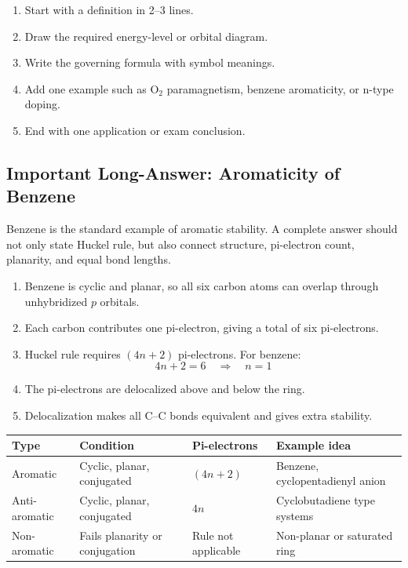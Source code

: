 \documentclass[12pt,a4paper]{article}
\begin{document}
\begin{tcolorbox}[masonbox, title={How to Write 10-Mark Answers in This Module}]
\begin{enumerate}[leftmargin=*, itemsep=3pt, topsep=2pt]
  \item Start with a definition in 2--3 lines.
  \item Draw the required energy-level or orbital diagram.
  \item Write the governing formula with symbol meanings.
  \item Add one example such as $\mathrm{O_2}$ paramagnetism, benzene aromaticity, or n-type doping.
  \item End with one application or exam conclusion.
\end{enumerate}
\end{tcolorbox}

\subsection{Important Long-Answer: Aromaticity of Benzene}
Benzene is the standard example of aromatic stability. A complete answer should not only state Huckel rule, but also connect structure, pi-electron count, planarity, and equal bond lengths.

\begin{enumerate}[leftmargin=*, itemsep=3pt, topsep=2pt]
  \item Benzene is cyclic and planar, so all six carbon atoms can overlap through unhybridized $p$ orbitals.
  \item Each carbon contributes one pi-electron, giving a total of six pi-electrons.
  \item Huckel rule requires $(4n+2)$ pi-electrons. For benzene:
  \[
    4n+2=6\quad\Rightarrow\quad n=1
  \]
  \item The pi-electrons are delocalized above and below the ring.
  \item Delocalization makes all C--C bonds equivalent and gives extra stability.
\end{enumerate}

\begin{tcolorbox}[examplebox, title={Exam Comparison: Aromatic, Anti-Aromatic and Non-Aromatic}]
\begin{tabularx}{\linewidth}{|B{3.0cm}|Y|Y|Y|}
\hline
\textbf{Type} & \textbf{Condition} & \textbf{Pi-electrons} & \textbf{Example idea} \\
\hline
Aromatic & Cyclic, planar, conjugated & $(4n+2)$ & Benzene, cyclopentadienyl anion \\
\hline
Anti-aromatic & Cyclic, planar, conjugated & $4n$ & Cyclobutadiene type systems \\
\hline
Non-aromatic & Fails planarity or conjugation & Rule not applicable & Non-planar or saturated ring \\
\hline
\end{tabularx}
\end{tcolorbox}
\end{document}
